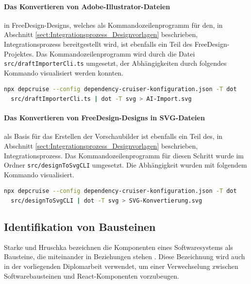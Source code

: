 \paragraph{Das Konvertieren von Adobe-Illustrator-Dateien} in FreeDesign-Designs, welches als Kommandozeilenprogramm für den, in Abschnitt \ref{sect:Integrationsprozess_Designvorlagen} beschrieben, Integrationsprozess bereitgestellt wird, ist ebenfalls ein Teil des FreeDesign-Projektes. 
Das Kommandozeilenprogramm wird durch die Datei \lstinline|src/draftImporterCli.ts| umgesetzt, der Abhängigkeiten durch folgendes Kommando visualisiert werden konnten.
\begin{lstlisting}[language={sh}, label=depcruise-draft-import, caption=Visualisierung der Abhängigkeiten des Programms zum Import der AI-Dateien]
npx depcruise --config dependency-cruiser-konfiguration.json -T dot 
  src/draftImporterCli.ts | dot -T svg > AI-Import.svg
\end{lstlisting}

\paragraph{Das Konvertieren von FreeDesign-Designs in SVG-Dateien} als Basis für das Erstellen der Vorschaubilder ist ebenfalls ein Teil des, in Abschnitt \ref{sect:Integrationsprozess_Designvorlagen} beschrieben, Integrationsprozess.  
Das Kommandozeilenprogramm für diesen Schritt wurde im Ordner \lstinline|src/designToSvgCLI| umgesetzt. Die Abhängigkeit wurden mit folgendem Kommando visualisiert.
\begin{lstlisting}[language={sh}, label=depcruise-draft-import, caption=Visualisierung des Kommandozeilenprogramms designToSvgCLI]
npx depcruise --config dependency-cruiser-konfiguration.json -T dot 
  src/designToSvgCLI | dot -T svg > SVG-Konvertierung.svg
\end{lstlisting}
    




\subsection{Identifikation von Bausteinen}
Starke und Hruschka bezeichnen die Komponenten eines Softwaresystems als Bausteine, die miteinander in Beziehungen stehen \autocite[vgl.][24]{Starke2011}. Diese Bezeichnung wird auch in der vorliegenden Diplomarbeit verwendet, um einer Verwechselung zwischen Softwarebausteinen und React-Komponenten vorzubeugen.

